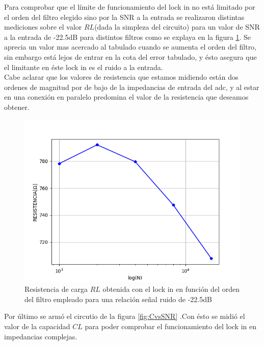 \documentclass[11pt,a4paper]{extarticle}
\begin{document}
\begin{multicols}{2}
Para comprobar que el límite de funcionamiento 
del lock in no está limitado por el orden del 
filtro elegido sino por la SNR a la entrada
se realizaron distintas mediciones 
sobre el valor $RL$(dada la simpleza del circuito) 
para un valor de SNR a la entrada de -22.5dB para 
distintos filtros como se explaya en la figura 
\ref{fig:RORDEN}. Se aprecia un valor mas acercado 
al tabulado cuando se aumenta el orden del filtro, sin 
embargo está lejos de entrar en la cota del error 
tabulado, y ésto asegura que el limitante en éste 
lock in es el ruido a la entrada.\\

Cabe aclarar que los valores de resistencia que estamos
 midiendo están dos ordenes de magnitud por de 
 bajo de la impedancias de entrada del adc, y al estar en 
una conexión en paralelo predomina el valor de la resistencia 
que deseamos obtener.\\

\begin{figure}[H]
	\centering
	\includegraphics[width=\linewidth]{Images/RORDEN.png}
	\caption{Resistencia de carga $RL$ obtenida con 
	el lock in en función
	del orden del filtro empleado para  
	una relación señal ruido de -22.5dB}
	\label{fig:RORDEN}
\end{figure}

Por último se armó el circutio de la figura 
\ref{fig:CvsSNR} .Con ésto 
se midió el valor de la capacidad $CL$ para poder 
comprobar el funcionamiento del lock in en 
impedancias complejas.\\ 


\end{multicols}
\end{document}
